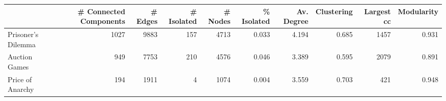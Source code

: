 \begin{tabular}{lrrrrrrrrr}
\toprule
{} &  \# Connected Components &  \# Edges &  \# Isolated &  \# Nodes &  \% Isolated &  Av. Degree &  Clustering &  Largest cc &  Modularity \\
\midrule
Prisoner's Dilemma &                    1027 &     9883 &         157 &     4713 &       0.033 &       4.194 &       0.685 &        1457 &       0.931 \\
Auction Games      &                     949 &     7753 &         210 &     4576 &       0.046 &       3.389 &       0.595 &        2079 &       0.891 \\
Price of Anarchy   &                     194 &     1911 &           4 &     1074 &       0.004 &       3.559 &       0.703 &         421 &       0.948 \\
\bottomrule
\end{tabular}
